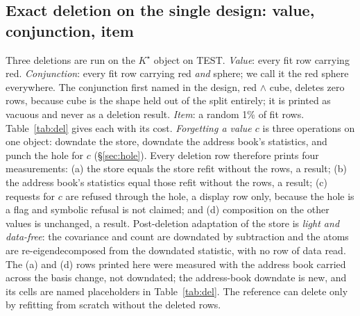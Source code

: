 \documentclass{article} %
\newcommand{\Kstar}{\ensuremath{K^{\star}}}
\begin{document}
\subsection{Exact deletion on the single design: value, conjunction, item}
\label{sec:shapes-del}

Three deletions are run on the $\Kstar$ object on TEST. \emph{Value}: every fit row carrying
red. \emph{Conjunction}: every fit row carrying red \emph{and} sphere; we call it the red
sphere everywhere. The conjunction first named in the design, red $\wedge$ cube, deletes zero rows,
because cube is the shape held out of the split entirely; it is printed as vacuous and never as
a deletion result. \emph{Item}: a random 1\% of fit rows. Table~\ref{tab:del} gives each with
its cost. \emph{Forgetting a value $c$} is three operations on one object: downdate the store,
downdate the address book's statistics, and punch the hole for $c$ (\S\ref{sec:hole}). Every
deletion row therefore prints four measurements: (a) the store equals the store refit without the
rows, a result; (b) the address book's statistics equal those refit without the rows, a result;
(c) requests for $c$ are refused through the hole, a display row only, because the hole is a flag
and symbolic refusal is not claimed; and (d) composition on the other values is unchanged, a
result. Post-deletion adaptation of the store is \emph{light and data-free}: the covariance
and count are downdated by subtraction and the atoms are re-eigendecomposed from the downdated
statistic, with no row of data read. The (a) and (d) rows printed here were measured with the
address book carried across the basis change, not downdated; the address-book downdate is new,
and its cells are named placeholders in Table~\ref{tab:del}.
The reference can delete only by refitting from scratch without the deleted rows.
\end{document}
